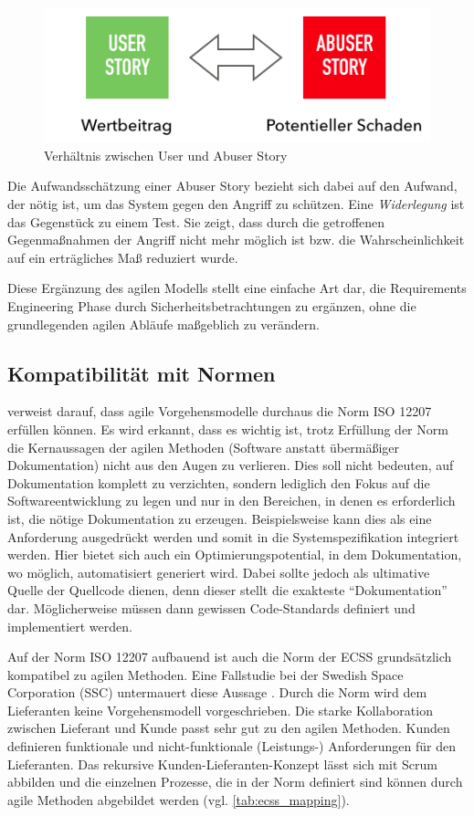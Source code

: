 \begin{figure}
  \centering
  \includegraphics[width=0.6 \textwidth]{img/abuser-story.png}
  \caption{Verhältnis zwischen User und Abuser Story}
  \label{fig:abuser-story}
\end{figure}

Die Aufwandsschätzung einer Abuser Story bezieht sich dabei auf den Aufwand, der nötig ist, um das System gegen den Angriff zu schützen.
Eine \emph{Widerlegung} ist das Gegenstück zu einem Test. 
Sie zeigt, dass durch die getroffenen Gegenmaßnahmen der Angriff nicht mehr möglich ist bzw. die Wahrscheinlichkeit auf ein erträgliches Maß reduziert wurde.
\parencite[Vgl.][S. 2]{peeters2005agile}

Diese Ergänzung des agilen Modells stellt eine einfache Art dar, die Requirements Engineering Phase durch Sicherheitsbetrachtungen zu ergänzen, ohne die grundlegenden agilen Abläufe maßgeblich zu verändern.

\subsection{Kompatibilität mit Normen} %

\parencite[][]{Theunissen:2003:SAS:954014.954034} verweist darauf, dass agile Vorgehensmodelle durchaus die Norm ISO 12207 erfüllen können.
Es wird erkannt, dass es wichtig ist, trotz Erfüllung der Norm die Kernaussagen der agilen Methoden (Software anstatt übermäßiger Dokumentation) nicht aus den Augen zu verlieren.
Dies soll nicht bedeuten, auf Dokumentation komplett zu verzichten, sondern lediglich den Fokus auf die Softwareentwicklung zu legen und nur in den Bereichen, in denen es erforderlich ist, die nötige Dokumentation zu erzeugen.
Beispielsweise kann dies als eine Anforderung ausgedrückt werden und somit in die Systemspezifikation integriert werden.
Hier bietet sich auch ein Optimierungspotential, in dem Dokumentation, wo möglich, automatisiert generiert wird.
Dabei sollte jedoch als ultimative Quelle der Quellcode dienen, denn dieser stellt die exakteste \enquote{Dokumentation} dar.
Möglicherweise müssen dann gewissen Code-Standards definiert und implementiert werden.

Auf der Norm ISO 12207 aufbauend ist auch die Norm der ECSS grundsätzlich kompatibel zu agilen Methoden.
Eine Fallstudie bei der Swedish Space Corporation (SSC) untermauert diese Aussage \parencite[vgl.][S. 1]{Ahmad:2010:ESC:1890810.1890816}.
Durch die Norm wird dem Lieferanten keine Vorgehensmodell vorgeschrieben.
Die starke Kollaboration zwischen Lieferant und Kunde passt sehr gut zu den agilen Methoden.
Kunden definieren funktionale und nicht-funktionale (Leistungs-) Anforderungen für den Lieferanten.
Das rekursive Kunden-Lieferanten-Konzept lässt sich mit Scrum abbilden und die einzelnen Prozesse, die in der Norm definiert sind können durch agile Methoden abgebildet werden (vgl. \autoref{tab:ecss_mapping}).

